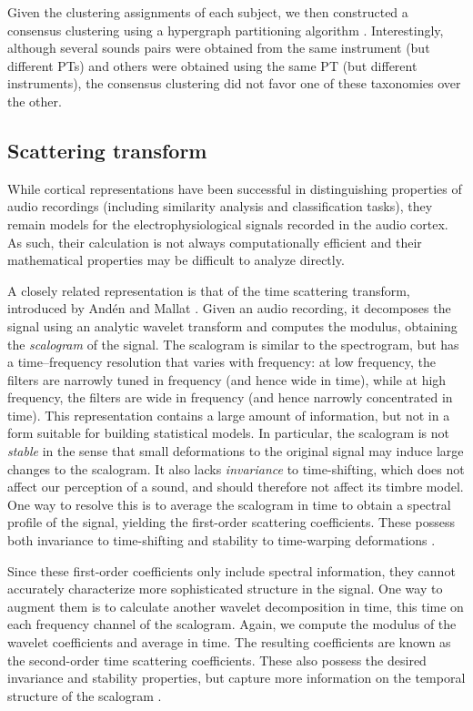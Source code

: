 \documentclass[10pt,letterpaper]{article}
\begin{document}
Given the clustering assignments of each subject, we then constructed a consensus clustering using a hypergraph partitioning algorithm \cite{kernighan1970efficient,han1997scalable,strehl2002cluster}.
Interestingly, although several sounds pairs were obtained from the same instrument (but different PTs) and others were obtained using the same PT (but different instruments), the consensus clustering did not favor one of these taxonomies over the other.

\subsection*{Scattering transform}
\label{sec:scattering}

While cortical representations have been successful in distinguishing properties of audio recordings (including similarity analysis and classification tasks), they remain models for the electrophysiological signals recorded in the audio cortex.
As such, their calculation is not always computationally efficient and their mathematical properties may be difficult to analyze directly.

A closely related representation is that of the time scattering transform, introduced by And\'{e}n and Mallat \cite{anden2011multiscale,anden2014deep}.
Given an audio recording, it decomposes the signal using an analytic wavelet transform and computes the modulus, obtaining the \emph{scalogram} of the signal.
The scalogram is similar to the spectrogram, but has a time--frequency resolution that varies with frequency: at low frequency, the filters are narrowly tuned in frequency (and hence wide in time), while at high frequency, the filters are wide in frequency (and hence narrowly concentrated in time).
This representation contains a large amount of information, but not in a form suitable for building statistical models.
In particular, the scalogram is not \emph{stable} in the sense that small deformations to the original signal may induce large changes to the scalogram.
It also lacks \emph{invariance} to time-shifting, which does not affect our perception of a sound, and should therefore not affect its timbre model.
One way to resolve this is to average the scalogram in time to obtain a spectral profile of the signal, yielding the first-order scattering coefficients.
These possess both invariance to time-shifting and stability to time-warping deformations \cite{anden2014deep}.

Since these first-order coefficients only include spectral information, they cannot accurately characterize more sophisticated structure in the signal.
One way to augment them is to calculate another wavelet decomposition in time, this time on each frequency channel of the scalogram.
Again, we compute the modulus of the wavelet coefficients and average in time.
The resulting coefficients are known as the second-order time scattering coefficients.
These also possess the desired invariance and stability properties, but capture more information on the temporal structure of the scalogram \cite{anden2014deep}.
\end{document}
